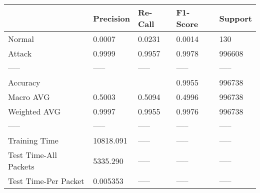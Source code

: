 \begin{tabular}{lllll}
\toprule
{} &  Precision & Re-Call & F1-Score & Support \\
\midrule
Normal                &     0.0007 &  0.0231 &   0.0014 &     130 \\
Attack                &     0.9999 &  0.9957 &   0.9978 &  996608 \\
-----                 &      ----- &   ----- &    ----- &   ----- \\
Accuracy              &            &         &   0.9955 &  996738 \\
Macro AVG             &     0.5003 &  0.5094 &   0.4996 &  996738 \\
Weighted AVG          &     0.9997 &  0.9955 &   0.9976 &  996738 \\
-----                 &      ----- &   ----- &    ----- &   ----- \\
Training Time         &  10818.091 &   ----- &    ----- &   ----- \\
Test Time-All Packets &   5335.290 &   ----- &    ----- &   ----- \\
Test Time-Per Packet  &   0.005353 &   ----- &    ----- &   ----- \\
\bottomrule
\end{tabular}
